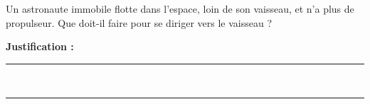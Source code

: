 Un astronaute immobile flotte dans l'espace, loin de son vaisseau, et n'a plus de propulseur. Que doit-il faire pour se diriger vers le vaisseau ?

\choices

\noindent\textbf{Justification :} \hrulefill \\[2.5ex]
\rule{\linewidth}{0.4pt} \\[2.5ex]
\rule{\linewidth}{0.4pt}
\vfill
